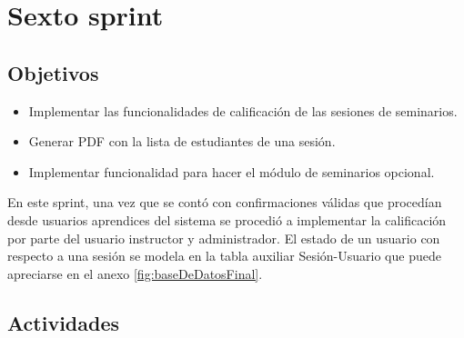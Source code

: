 \section{Sexto sprint} %
\label{sec:sexto_sprint}

\subsection{Objetivos}

\begin{itemize}
	\item Implementar las funcionalidades de calificación de las sesiones de seminarios.
	\item Generar PDF con la lista de estudiantes de una sesión.
	\item Implementar funcionalidad para hacer el módulo de seminarios opcional.
\end{itemize}

En este sprint, una vez que se contó con confirmaciones válidas que procedían desde usuarios aprendices del sistema se procedió a implementar la calificación por parte del usuario instructor y administrador. El estado de un usuario con respecto a una sesión se modela en la tabla auxiliar Sesión-Usuario que puede apreciarse en el anexo \ref{fig:baseDeDatosFinal}.

\subsection{Actividades} %
\label{sub:actividades6}

